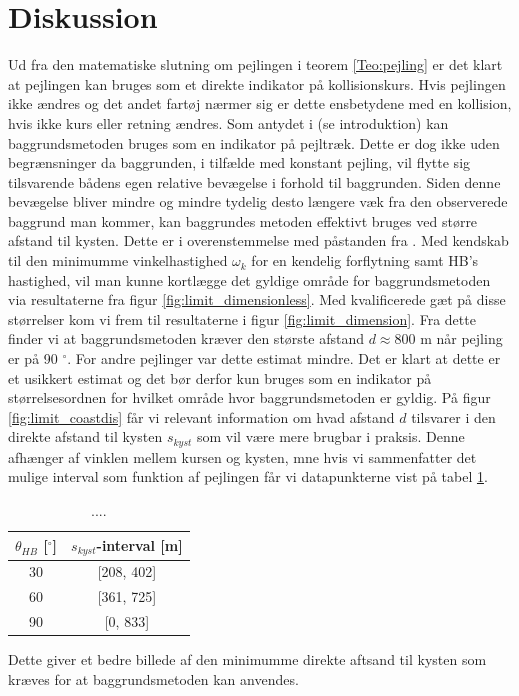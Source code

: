 \documentclass[%
 reprint,
nofootinbib,
aps,
]{revtex4-1}
\begin{document}
\section{Diskussion}
Ud fra den matematiske slutning om pejlingen i teorem \ref{Teo:pejling} er det klart at pejlingen kan bruges som et direkte indikator på kollisionskurs. Hvis pejlingen ikke ændres og det andet fartøj nærmer sig er dette ensbetydene med en kollision, hvis ikke kurs eller retning ændres. Som antydet i \cite{duelighed} (se introduktion) kan baggrundsmetoden bruges som en indikator på pejltræk. Dette er dog ikke uden begrænsninger da baggrunden, i tilfælde med konstant pejling, vil flytte sig tilsvarende bådens egen relative bevægelse i forhold til baggrunden. Siden denne bevægelse bliver mindre og mindre tydelig desto længere væk fra den observerede baggrund man kommer, kan baggrundes metoden effektivt bruges ved større afstand til kysten. Dette er i overenstemmelse med påstanden fra \cite{duelighed}. Med kendskab til den minimumme vinkelhastighed $\omega_k$ for en kendelig forflytning samt HB's hastighed, vil man kunne kortlægge det gyldige område for baggrundsmetoden via resultaterne fra figur \ref{fig:limit_dimensionless}. Med kvalificerede gæt på disse størrelser kom vi frem til resultaterne i figur \ref{fig:limit_dimension}. Fra dette finder vi at baggrundsmetoden kræver den største afstand $d \approx 800$ m når pejling er på 90 $^{\circ}$. For andre pejlinger var dette estimat mindre. Det er klart at dette er et usikkert estimat og det bør derfor kun bruges som en indikator på størrelsesordnen for hvilket område hvor baggrundsmetoden er gyldig. På figur \ref{fig:limit_coastdis} får vi relevant information om hvad afstand $d$ tilsvarer i den direkte afstand til kysten $s_{kyst}$ som vil være mere brugbar i praksis. Denne afhænger af vinklen mellem kursen og kysten, mne hvis vi sammenfatter det mulige interval som funktion af pejlingen får vi datapunkterne vist på tabel \ref{tab:valid_area}.
\begin{table}[H]
  \begin{center}
  \caption{....}
  \begin{tabular}{|c|c|} \hline
  $\theta_{HB}$ [$^{\circ}$] & $s_{kyst}$-interval [m]  \\ \hline
  30 & [208, 402] \\ \hline
  60 & [361, 725]  \\ \hline
  90 & [0, 833] \\ \hline
  \end{tabular}
  \label{tab:valid_area}
  \end{center}
\end{table}
Dette giver et bedre billede af den minimumme direkte aftsand til kysten som kræves for at baggrundsmetoden kan anvendes. \\
\\
\end{document}
